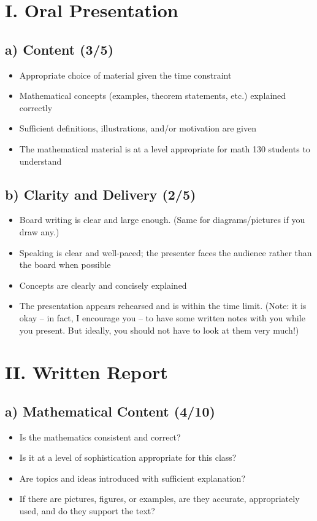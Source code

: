 \documentclass[12pt]{amsart}
\begin{document}
\section*{I. Oral Presentation}

\subsection*{a) Content (3/5)}
\begin{itemize}
	\item Appropriate choice of material given the time constraint
	\item Mathematical concepts (examples, theorem statements, etc.) explained correctly
	\item Sufficient definitions, illustrations, and/or motivation are given
	\item The mathematical material is at a level appropriate for math 130 students to understand
\end{itemize}

\subsection*{b) Clarity and Delivery (2/5)}
\begin{itemize}
	\item Board writing is clear and large enough. (Same for diagrams/pictures if you draw any.)
	\item Speaking is clear and well-paced; the presenter faces the audience rather than the board when possible
	\item Concepts are clearly and concisely explained
	\item The presentation appears rehearsed and is within the time limit. (Note: it is okay – in fact, I encourage you – to have some written notes with you while you present. But ideally, you should not have to look at them very much!)
\end{itemize}

\section*{II. Written Report}

\subsection*{a) Mathematical Content (4/10)}
\begin{itemize}
	\item Is the mathematics consistent and correct?
	\item Is it at a level of sophistication appropriate for this class?
	\item Are topics and ideas introduced with sufficient explanation?
	\item If there are pictures, figures, or examples, are they accurate, appropriately used, and do they support the text?
\end{itemize}
\end{document}
